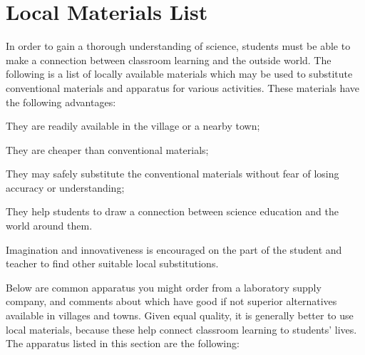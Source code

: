 
\chapter{Local Materials List}
\label{cha:local-materials}

In order to gain a thorough understanding of science, students must be able to make a connection between classroom learning and the outside world. The following is a list of locally available materials which may be used to substitute conventional materials and apparatus for various activities. These materials have the following advantages: 
\begin{itemize*}
\item They are readily available in the village or a nearby town;
\item They are cheaper than conventional materials; 
\item They may safely substitute the conventional materials without fear of losing accuracy or understanding; 
\item They help students to draw a connection between science education and the world around them.
\end{itemize*}
Imagination and innovativeness is encouraged on the part of the student and teacher to find other suitable local substitutions. 

Below are common apparatus you might order from a laboratory supply company, 
and comments about which have good if not superior alternatives 
available in villages and towns. 
Given equal quality, 
it is generally better to use local materials, 
because these help connect classroom learning to students' lives.\\

The apparatus listed in this section are the following:

